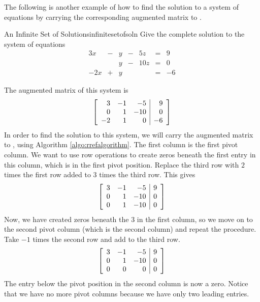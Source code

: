 The following is another example of how to find the solution to a system of equations by carrying the corresponding
augmented matrix to \rref. 

\begin{example}{An Infinite Set of Solutions}{infinitesetofsoln}
Give the complete solution to the system of equations \:
\begin{equation}
\begin{array}{ccccccccc}
3x&-&y&-&5z&=&9 \\
&&y&-&10z&=&0 \\
-2x&+&y&&&=&-6
\end{array}
\end{equation}
\end{example}

\begin{solution} The augmented matrix of this system is
\begin{equation*}
\left[
\begin{array}{rrr|r}
 3 & -1 &  -5 & 9 \\
 0 &  1 & -10 & 0 \\
-2 &  1 &   0 & -6
\end{array}
\right]
\end{equation*}
In order to find the solution to this system, we will carry the augmented matrix to \rref, using Algorithm \ref{algo:rrefalgorithm}.
The first column is the first pivot column. We want to use row operations to create zeros beneath the first entry in this column, which is 
in the first pivot position. 
Replace the third row with $2$ times the first row added to $3$ times the
third row. This gives
\begin{equation*}
\left[
\begin{array}{rrr|r}
3 & -1 & -5 & 9 \\
0 & 1 & -10 & 0 \\
0 & 1 & -10 & 0
\end{array}
\right] 
\end{equation*}
Now, we have created zeros beneath the $3$ in the first column, so we move on to the second pivot column (which is the second column) and repeat the procedure. 
Take $-1$ times the second row and add to the third row.
\begin{equation*}
\left[
\begin{array}{rrr|r}
3 & -1 &  -5 & 9 \\
0 &  1 & -10 & 0 \\
0 &  0 &   0 & 0
\end{array}
\right]
\end{equation*}
The entry below the pivot position in the second column is now a zero. Notice that we have no more pivot columns because we 
have only two leading entries. 



\end{solution}
